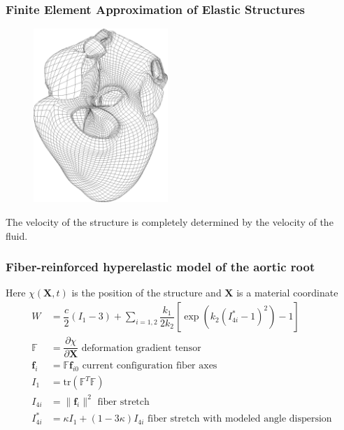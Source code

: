 \documentclass[8pt]{beamer}
\begin{document}
\begin{frame}
    \frametitle{Finite Element Approximation of Elastic Structures}
    \begin{figure}
        \includegraphics[width=2in]{heartmesh1.png}
    \end{figure}
    The velocity of the structure is completely determined by the velocity of
    the fluid.
\end{frame}

\begin{frame}
    \frametitle{Fiber-reinforced hyperelastic model of the aortic root}
    Here \(\chi(\mathbf{X}, t)\) is the position of the structure and
    \(\mathbf{X}\) is a material coordinate
    \begin{align*}
        W &= \dfrac{c}{2} (I_1 - 3)
        + \sum_{i = 1,2}
        \dfrac{k_1}{2 k_2}
        \left[
        \exp(k_2 (I^*_{4i} - 1)^2) - 1
        \right]                                                               \\
        \mathbb{F} &= \dfrac{\partial \chi}{\partial \mathbf{X}}
        \text{ deformation gradient tensor}                                   \\
        \mathbf{f}_i &= \mathbb{F} \mathbf{f}_{i0} \text{ current configuration
        fiber axes}                                                           \\
        I_1 &= \mathrm{tr}(\mathbb{F}^T \mathbb{F})                           \\
        I_{4i} &= \|\mathbf{f}_i\|^2 \text{ fiber stretch}                    \\
        I^*_{4i} &= \kappa I_1 + (1 - 3 \kappa) I_{4 i} \text{ fiber stretch
        with modeled angle dispersion}
    \end{align*}
\end{frame}
\end{document}
